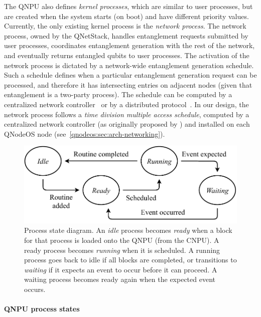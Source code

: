 The \ac{QNPU} also defines \emph{kernel processes}, which are similar to user processes, but are created when the system starts (on boot) and have different priority values. Currently, the only existing kernel process is the \emph{network process}. The network process, owned by the \ac{QNetStack}, handles entanglement requests submitted by user processes, coordinates entanglement generation with the rest of the network, and eventually returns entangled qubits to user processes. The activation of the network process is dictated by a network-wide entanglement generation schedule. Such a schedule defines when a particular entanglement generation request can be processed, and therefore it has intersecting entries on adjacent nodes (given that entanglement is a two-party process). The schedule can be computed by a centralized network controller~\cite{skrzypczyk_2021_arch} or by a distributed protocol~\cite{dahlberg_2019_egp}. In our design, the network process follows a \emph{time division multiple access schedule}, computed by a centralized network controller (as originally proposed by \textcite{skrzypczyk_2021_arch}) and installed on each \ac{QNodeOS} node (see~\cref{qnodeos:sec:arch-networking}).

\begin{figure}
\begin{center}
\includegraphics[width=\linewidth]{figures/qnodeos/supplementary/process-states.pdf}
\end{center}
\caption[]{Process state diagram. An \emph{idle} process becomes \emph{ready} when a block for that process is loaded onto the \ac{QNPU} (from the \ac{CNPU}). A ready process becomes \emph{running} when it is scheduled. A running process goes back to idle if all blocks are completed, or transitions to \emph{waiting} if it expects an event to occur before it can proceed. A waiting process becomes ready again when the expected event occurs.}
\label{qnodeos:fig:process-states}
\end{figure}

\paragraph{QNPU process states}


